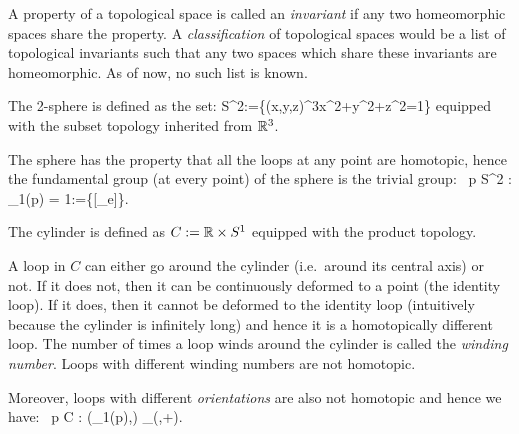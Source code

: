 A property of a topological space is called an \emph{invariant} if any two homeomorphic spaces share the property. A \emph{classification} of topological spaces would be a list of topological invariants such that any two spaces which share these invariants are homeomorphic. As of now, no such list is known. 

\be
The 2-sphere is defined as the set:
\bse
S^2:=\{(x,y,z)\in \R^3\mid x^2+y^2+z^2=1\}
\ese
equipped with the subset topology inherited from $\mathbb{R}^3$.

\begin{center}
\end{center}

The sphere has the property that all the loops at any point are homotopic, hence the fundamental group (at every point) of the sphere is the trivial group:
\bse
\forall \, p \in S^2 : \pi_1(p) = 1:=\{[\g_e]\}.
\ese
\ee

\be
The cylinder is defined as $C:=\mathbb{R}\times S^1$ equipped with the product topology.

\begin{center}
\end{center}

A loop in $C$ can either go around the cylinder (i.e.\ around its central axis) or not. If it does not, then it can be continuously deformed to a point (the identity loop). If it does, then it cannot be deformed to the identity loop (intuitively because the cylinder is infinitely long) and hence it is a homotopically different loop. The number of times a loop winds around the cylinder is called the \emph{winding number}. Loops with different winding numbers are not homotopic.

Moreover, loops with different \emph{orientations} are also not homotopic and hence we have:
\bse
\forall \, p \in C : (\pi_1(p),\bullet) \cong_(\Z,+).
\ese
\ee

